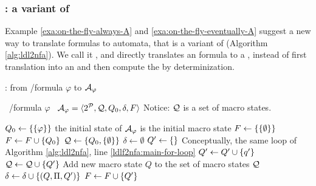 \subsubsection{\LDLfToDFA: a variant of \LDLfToNFA}

Example \ref{exa:on-the-fly-always-A} and \ref{exa:on-the-fly-eventually-A} suggest a new way to translate \LLf formulas to automata, that is a variant of \LDLfToNFA (Algorithm \ref{alg:ldl2nfa}). We call it \LDLfToDFA, and directly translates an \LLf formula to a \DFA, instead of first translation into an \NFA and then compute the \DFA by determinization.

\begin{algorithm}
	\caption{\LDLfToDFA: from \LTLf/\LDLf formula $\varphi$ to \DFA $\mathcal{A}_\varphi$}
	\label{alg:ldlf2dfa}
	\begin{algorithmic}[1]
		\State \algInput\ \LDLf/\LTLf formula $\varphi$
		\State \algOutput\ \DFA $\mathcal{A}_\varphi = \langle 2^{\mathcal{P}}, \mathcal{Q}, Q_0, \delta, F \rangle$ \Comment Notice: $\mathcal{Q}$ is a set of macro states.
		
		\State $Q_0 \gets \{\{\varphi\}\}$ \Comment the initial state of $\mathcal{A}_\varphi$ is the initial macro state
		\State $F \gets \{\{\emptyset\}\}$
		 \label{ldlf2dfa:delta-eps-init}
		\State $F \gets F \cup \{Q_0\}$
		\EndIf
		\State $\mathcal{Q} \gets \{Q_0, \{\emptyset\}\}$
		\State $\delta \gets \emptyset$
				\State $Q' \gets \{\}$
				 \label{ldlf2dfa:main-for-loop}\Comment Conceptually, the same loop of Algorithm \ref{alg:ldl2nfa}, line \ref{ldlf2nfa:main-for-loop}
					 \label{ldlf2dfa:delta-for-loop}
						\State $Q' \gets Q' \cup \{q'\}$
					\EndIf
				\EndFor
				\State $\mathcal{Q} \gets \mathcal{Q} \cup \{Q'\}$ \Comment Add new macro state  $Q$ to the set of macro states $\mathcal{Q}$
				\State $\delta \gets \delta \cup \{(Q, \Pi, Q')\}$
				 \label{ldlf2dfa:delta-eps-end}
					\State $F \gets F \cup \{Q'\}$
				\EndIf
			\EndFor
		
		\EndWhile
		
	\end{algorithmic}
	
\end{algorithm}
